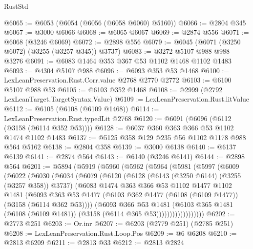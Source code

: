 \begin{lexlean}{RustStd}
\begin{coremodule}
@6065 := @6053 (@6054 (@6056 (@6058 @6060) @5160))
@6066 := @2804 @345
@6067 := @3000 @6066
@6068 := @6065 @6067
@6069 := @2874 @556
@6071 := @6068 (@3246 @6069)
@6072 := @2898 @556
@6079 := @6045 (@6071 (@3250 @6072) (@3255 (@3257 @345)) @3737)
@6083 := @3272 @5107 @988 @988 @3276
@6091 := @6083 @1464 @353 @367 @53 @1102 @1468 @1102 @1483
@6093 := @4304 @5107 @988
@6096 := @6093 @353 @53 @1468
@6100 := LexLeanPreservation.Rust.Corr.value @2768 @2770 @2772
@6103 := @6100 @5107 @988 @53
@6105 := @6103 @352 @1468
@6108 := @2999 (@2792 LexLeanTarget.TargetSyntax.Value)
@6109 := LexLeanPreservation.Rust.litValue
@6112 := @6105 (@6108 (@6109 @1468))
@6114 := LexLeanPreservation.Rust.typedLit @2768
@6120 := @6091 (@6096 (@6112 (@3158 (@6114 @352 @53))))
@6128 := @6037 @360 @363 @366 @53 @1102 @1474 @1102 @1483
@6137 := @5125 @358 @129 @235 @56 @1102 @1178 @988 @564 @5162
@6138 := @2804 @358
@6139 := @3000 @6138
@6140 := @6137 @6139
@6141 := @2874 @564
@6143 := @6140 (@3246 @6141)
@6144 := @2898 @564
@6201 := @5894
    (@5919
      (@5960
        (@5962
          (@5964
            (@5981
              (@5997
                (@6009
                  (@6022
                    (@6030
                      (@6034
                        (@6079
                          (@6120
                            (@6128
                              (@6143 (@3250 @6144) (@3255 (@3257 @358)) @3737)
                              (@6083
                                @1474
                                @363
                                @366
                                @53
                                @1102
                                @1477
                                @1102
                                @1481
                                (@6093
                                  @363
                                  @53
                                  @1477
                                  (@6103 @362 @1477 (@6108 (@6109 @1477)) (@3158 (@6114 @362 @53))))
                                (@6093
                                  @366
                                  @53
                                  @1481
                                  (@6103
                                    @365
                                    @1481
                                    (@6108 (@6109 @1481))
                                    (@3158 (@6114 @365 @53))))))))))))))))))
@6202 := @2773 @251
@6203 := Or.inr
@6207 := @6203 (@2779 @251) (@2785 @251)
@6208 := LexLeanPreservation.Rust.Loop.Pos
@6209 := @6 @6208
@6210 := @2813 @6209
@6211 := @2813 @33
@6212 := @2813 @2824

\end{coremodule}
\end{lexlean}
